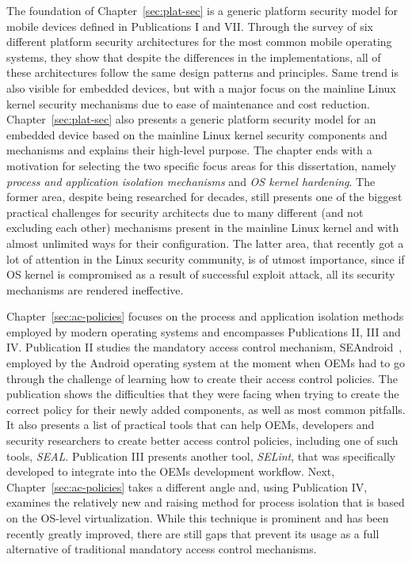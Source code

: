 The foundation of Chapter~\ref{sec:plat-sec} is a generic platform security model for mobile devices defined in Publications I and VII. Through the survey of six different platform security architectures for the most common mobile operating systems, they show that despite the differences in the implementations, all of these architectures follow the same design patterns and principles. Same trend is also visible for embedded devices, but with a major focus on the mainline Linux kernel security mechanisms due to ease of maintenance and cost reduction. Chapter~\ref{sec:plat-sec} also presents a generic platform security model for an embedded device based on the mainline Linux kernel security components and mechanisms and explains their high-level purpose. The chapter ends with a motivation for selecting the two specific focus areas for this dissertation, namely \textit{process and application isolation mechanisms} and \textit{OS kernel hardening}. The former area, despite being researched for decades, still presents one of the biggest practical challenges for security architects due to many different (and not excluding each other) mechanisms present in the mainline Linux kernel and with almost unlimited ways for their configuration. The latter area, that recently got a lot of attention in the Linux security community, is of utmost importance, since if OS kernel is compromised as a result of successful exploit attack, all its security mechanisms are rendered ineffective.     

Chapter~\ref{sec:ac-policies} focuses on the process and application isolation methods employed by modern operating systems and encompasses Publications II, III and IV. Publication II studies the mandatory access control mechanism, SEAndroid~\cite{smalley12}, employed by the Android operating system at the moment when OEMs had to go through the challenge of learning how to create their access control policies. The publication shows the difficulties that they were facing when trying to create the correct policy for their newly added components, as well as most common pitfalls. It also presents a list of practical tools that can help OEMs, developers and security researchers to create better access control policies, including one of such tools, \textit{SEAL}. Publication III presents another tool, \textit{SELint}, that was specifically developed to integrate into the OEMs development workflow. Next, Chapter~\ref{sec:ac-policies} takes a different angle and, using Publication IV, examines the relatively new and raising method for process isolation that is based on the OS-level virtualization. While this technique is prominent and has been recently greatly improved, there are still gaps that prevent its usage as a full alternative of traditional mandatory access control mechanisms. 

